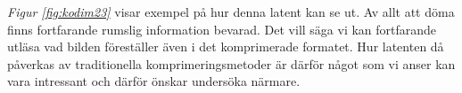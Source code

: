 \textit{Figur \ref{fig:kodim23}} visar exempel på hur denna latent kan se ut. Av allt att döma finns fortfarande rumslig information bevarad. Det vill säga vi kan fortfarande utläsa vad bilden föreställer även i det komprimerade formatet. Hur latenten då påverkas av traditionella komprimeringsmetoder är därför något som vi anser kan vara intressant och därför önskar undersöka närmare. 